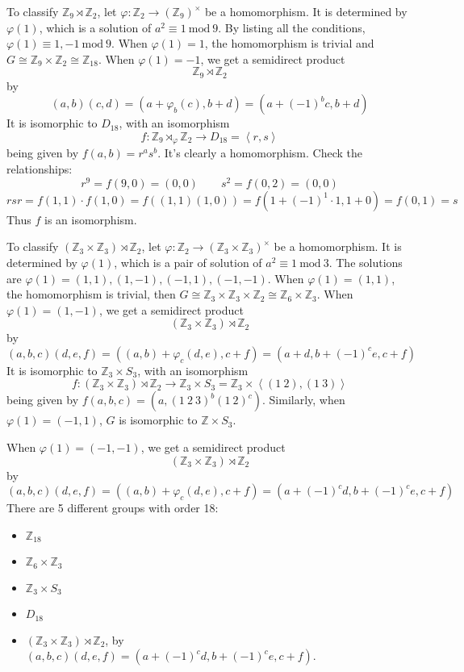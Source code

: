 To classify $\mathbb{Z}_{9}\rtimes \mathbb{Z}_{2}$, let $\varphi:\mathbb{Z}_{2}\to(\mathbb{Z}_{9})^{\times}$ be a homomorphism. It is determined by $\varphi(1)$, which is a solution of $a^{2}\equiv1\ \mathrm{mod}\ 9$. By listing all the conditions, $\varphi (1)\equiv 1,-1\ \mathrm{mod}\ 9$. When $\varphi(1)=1$, the homomorphism is trivial and $G\cong\mathbb{Z}_{9}\times \mathbb{Z}_{2}\cong\mathbb{Z}_{18}$. When $\varphi(1)=-1$, we get a semidirect product
\[
\mathbb{Z}_{9}\rtimes \mathbb{Z}_{2}
\]
by
\[
(a,b)(c,d)=(a+\varphi_{b}(c),b+d)=(a+(-1)^{b}c,b+d)
\]
It is isomorphic to $D_{18}$, with an isomorphism
\[
f:\mathbb{Z}_{9}\rtimes_{\varphi}\mathbb{Z}_{2}\to D_{18}= \left< r,s \right>
\]
being given by $f(a,b)=r^{a}s^{b}$. It's clearly a homomorphism. Check the relationships:
\[
r^{9}=f(9,0)=(0,0)\qquad s^2=f(0,2)=(0,0)
\]
\[
rsr=f(1,1)\cdot f(1,0)=f((1,1)(1,0))=f(1+(-1)^{1}\cdot1,1+0)=f(0,1)=s
\]
Thus $f$ is an isomorphism.

To classify $(\mathbb{Z}_{3}\times \mathbb{Z}_{3})\rtimes \mathbb{Z}_{2}$, let $\varphi:\mathbb{Z}_{2}\to(\mathbb{Z}_{3}\times \mathbb{Z}_{3})^{\times}$ be a homomorphism. It is determined by $\varphi(1)$, which is a pair of solution of $a^2\equiv1\ \mathrm{mod}\ 3$. The solutions are $\varphi(1)=(1,1),(1,-1),(-1,1),(-1,-1)$. When $\varphi(1)=(1,1 )$, the homomorphism is trivial, then $G\cong \mathbb{Z}_{3}\times \mathbb{Z}_{3}\times \mathbb{Z}_{2}\cong \mathbb{Z}_{6}\times \mathbb{Z}_{3}$. When $\varphi(1)=(1,-1)$, we get a semidirect product
\[
(\mathbb{Z}_{3}\times \mathbb{Z}_{3}  )\rtimes \mathbb{Z}_{2}
\]
by
\[
(a,b,c)(d,e,f)=((a,b)+\varphi _{c}(d,e),c+f)=(a+d,b+(-1)^{c}e,c+f)
\]
It is isomorphic to $\mathbb{Z}_{3}\times S_3$, with an isomorphism
\[
f:(\mathbb{Z}_{3}\times \mathbb{Z}_{3}  )\rtimes \mathbb{Z}_{2}\to \mathbb{Z}_{3}\times S_3=\mathbb{Z}_{3}\times  \left< (1\ 2),(1\ 3) \right>
\]
being given by $f(a,b,c)=(a,(1\ 2\ 3)^{b}(1\ 2)^{c})$. Similarly, when $\varphi(1)=(-1,1)$, $G$ is isomorphic to $\mathbb{Z}\times S_3$.

When $\varphi(1)=(-1,-1)$, we get a semidirect product
\[
(\mathbb{Z}_{3}\times \mathbb{Z}_{3}  )\rtimes \mathbb{Z}_{2}
\]
by
\[
(a,b,c)(d,e,f)=((a,b)+\varphi _{c}(d,e),c+f)=(a+(-1)^{c}d,b+(-1)^{c}e,c+f)
\]
There are 5 different groups with order 18:

\begin{itemize}
	\item $\mathbb{Z}_{18}$
	\item $\mathbb{Z}_{6}\times \mathbb{Z}_{3}$
	\item $\mathbb{Z}_{3}\times S_3$
	\item $D_{18}$
	\item $(\mathbb{Z}_{3}\times \mathbb{Z}_{3})\rtimes \mathbb{Z}_{2}$, by $(a,b,c)(d,e,f)=(a+(-1)^{c}d,b+(-1)^{c}e,c+f)$.
\end{itemize}

